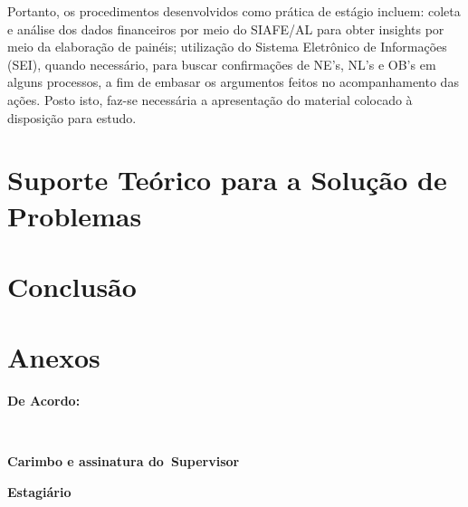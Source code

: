 \documentclass[12pt,a4paper]{article}
\begin{document}
	Portanto, os procedimentos desenvolvidos como prática de estágio incluem: coleta e análise dos dados financeiros por meio do SIAFE/AL 
	para obter insights por meio da elaboração de painéis; utilização do Sistema Eletrônico de Informações (SEI), quando necessário, 
	para buscar confirmações de NE’s, NL’s e OB’s em alguns processos, a fim de embasar os argumentos feitos no acompanhamento das ações.
	Posto isto, faz-se necessária a apresentação do material colocado à disposição para estudo.
	
	
	\section{Suporte Teórico para a Solução de Problemas}
	\hspace*{1,5cm}
	
	\section{Conclusão}
	\hspace*{1,5cm} 
	
	\section{Anexos}
	
	\newpage
	\vspace{2cm}
	\noindent \textbf{De Acordo:}
	
	\vfill

	\noindent
	\underline{\hspace{7cm}} \hfill \underline{\hspace{7cm}} \\[0.3cm]

	\begin{minipage}[t]{7cm}
		\centering
		\textbf{Carimbo e assinatura do\
		Supervisor}
	\end{minipage}
		\hfill
	\begin{minipage}[t]{7cm}
		\centering
		\textbf{Estagiário}
	\end{minipage}

	
\end{document}
